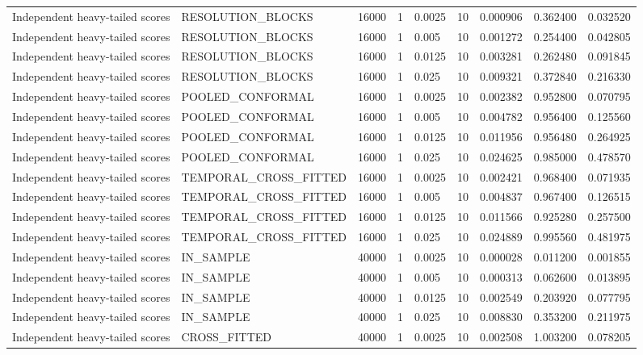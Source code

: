 \begin{tabular}{lllllllll}
Independent heavy-tailed scores & RESOLUTION\_BLOCKS & 16000 & 1 & 0.0025 & 10 & 0.000906 & 0.362400 & 0.032520 \\
Independent heavy-tailed scores & RESOLUTION\_BLOCKS & 16000 & 1 & 0.005 & 10 & 0.001272 & 0.254400 & 0.042805 \\
Independent heavy-tailed scores & RESOLUTION\_BLOCKS & 16000 & 1 & 0.0125 & 10 & 0.003281 & 0.262480 & 0.091845 \\
Independent heavy-tailed scores & RESOLUTION\_BLOCKS & 16000 & 1 & 0.025 & 10 & 0.009321 & 0.372840 & 0.216330 \\
Independent heavy-tailed scores & POOLED\_CONFORMAL & 16000 & 1 & 0.0025 & 10 & 0.002382 & 0.952800 & 0.070795 \\
Independent heavy-tailed scores & POOLED\_CONFORMAL & 16000 & 1 & 0.005 & 10 & 0.004782 & 0.956400 & 0.125560 \\
Independent heavy-tailed scores & POOLED\_CONFORMAL & 16000 & 1 & 0.0125 & 10 & 0.011956 & 0.956480 & 0.264925 \\
Independent heavy-tailed scores & POOLED\_CONFORMAL & 16000 & 1 & 0.025 & 10 & 0.024625 & 0.985000 & 0.478570 \\
Independent heavy-tailed scores & TEMPORAL\_CROSS\_FITTED & 16000 & 1 & 0.0025 & 10 & 0.002421 & 0.968400 & 0.071935 \\
Independent heavy-tailed scores & TEMPORAL\_CROSS\_FITTED & 16000 & 1 & 0.005 & 10 & 0.004837 & 0.967400 & 0.126515 \\
Independent heavy-tailed scores & TEMPORAL\_CROSS\_FITTED & 16000 & 1 & 0.0125 & 10 & 0.011566 & 0.925280 & 0.257500 \\
Independent heavy-tailed scores & TEMPORAL\_CROSS\_FITTED & 16000 & 1 & 0.025 & 10 & 0.024889 & 0.995560 & 0.481975 \\
Independent heavy-tailed scores & IN\_SAMPLE & 40000 & 1 & 0.0025 & 10 & 0.000028 & 0.011200 & 0.001855 \\
Independent heavy-tailed scores & IN\_SAMPLE & 40000 & 1 & 0.005 & 10 & 0.000313 & 0.062600 & 0.013895 \\
Independent heavy-tailed scores & IN\_SAMPLE & 40000 & 1 & 0.0125 & 10 & 0.002549 & 0.203920 & 0.077795 \\
Independent heavy-tailed scores & IN\_SAMPLE & 40000 & 1 & 0.025 & 10 & 0.008830 & 0.353200 & 0.211975 \\
Independent heavy-tailed scores & CROSS\_FITTED & 40000 & 1 & 0.0025 & 10 & 0.002508 & 1.003200 & 0.078205 \\

\end{tabular}

